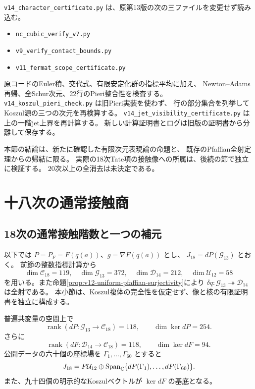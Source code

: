 \texttt{v14\_character\_certificate.py} は、原第13版の次の三ファイルを変更せず読み込む。
\begin{itemize}
 \item \texttt{nc\_cubic\_verify\_v7.py}
 \item \texttt{v9\_verify\_contact\_bounds.py}
 \item \texttt{v11\_fermat\_scope\_certificate.py}
\end{itemize}
原コードのEuler積、交代式、有限安定化群の指標平均に加え、
Newton--Adams再帰、全Schur次元、22行のPieri整合性を検査する。
\texttt{v14\_koszul\_pieri\_check.py} は旧Pieri実装を使わず、
行の部分集合を列挙してKoszul源の三つの次元を再検算する。
\texttt{v14\_jet\_visibility\_certificate.py} は上の一階jet上界を再計算する。
新しい計算証明書とログは旧版の証明書から分離して保存する。

本節の結論は、新たに確認した有限次元表現論の命題と、
既存のPfaffian全射定理からの帰結に限る。
実際の18次Tate項の接触像への所属は、後続の節で独立に検証する。
20次以上の全消去は未決定である。



\section{十八次の通常接触商}
\label{sec:v14-ordinary-contact}

\subsection{18次の通常接触階数と一つの補元}
\label{subsec:v14-eighteenth-contact-rank}

以下では $P=P_F=F(q(a))$、$g=\nabla F(q(a))$ とし、
$J_{18}=dP(\mathcal G_{13})$ とおく。
前節の整数指標計算から
\[
 \dim\mathcal C_{18}=119,\quad
 \dim\mathcal G_{13}=372,\quad
 \dim\mathcal D_{14}=212,\quad
 \dim\mathcal U_{12}=58
\]
を用いる。また命題\ref{prop:v12-uniform-pfaffian-surjectivity}により
$\delta q:\mathcal G_{13}\twoheadrightarrow\mathcal D_{14}$ は全射である。
本小節は、Koszul複体の完全性を仮定せず、像と核の有限証明書を独立に構成する。

\begin{proposition}[18次の通常接触階数]
\label{prop:v14-contact-rank-eighteenth}
普遍共変量の空間上で
\[
 \operatorname{rank}(dP:\mathcal G_{13}\longrightarrow\mathcal C_{18})=118,
 \qquad \dim\ker dP=254.
\]
さらに
\[
 \operatorname{rank}(dF:\mathcal D_{14}\longrightarrow\mathcal C_{18})=118,
 \qquad \dim\ker dF=94.
\]
公開データの六十個の座標場を $\Gamma_1,\ldots,\Gamma_{60}$ とすると
\[
 J_{18}=P\mathcal U_{12}\oplus
    \operatorname{Span}_{\mathbb C}\{dP(\Gamma_1),\ldots,dP(\Gamma_{60})\}.
\]
また、九十四個の明示的なKoszulベクトルが $\ker dF$ の基底となる。
\end{proposition}


